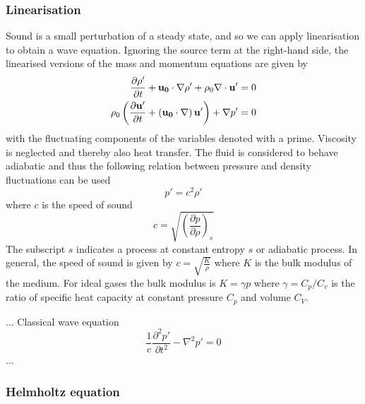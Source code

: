 \subsubsection*{Linearisation}
Sound is a small perturbation of a steady state, and so we can apply linearisation to obtain a wave equation.
Ignoring the source term at the right-hand side, the linearised versions of the mass and momentum equations are given by
\begin{align}
 \frac{\partial \rho'}{\partial t} + \mathbf{u_0} \cdot \nabla \rho' + \rho_0 \nabla \cdot \mathbf{u'} = 0 \\
 \rho_0 \left( \frac{\partial \mathbf{u'}}{\partial t} + \left(\mathbf{u_0} \cdot \nabla \right) \mathbf{u'}\right) + \nabla p' = 0
\end{align}
with the fluctuating components of the variables denoted with a prime. Viscosity
is neglected and thereby also heat transfer. The fluid is considered to behave
adiabatic and thus the following relation between pressure and density
fluctuations can be used
\begin{equation}
  p' = c^2 \rho'
\end{equation}
where $c$ is the speed of sound
\begin{equation}
  c = \sqrt{ \left( \frac{\partial p}{\partial \rho} \right)_{s} }
\end{equation}
The subscript $s$ indicates a process at constant entropy $s$ or adiabatic process.
In general, the speed of sound is given by $c = \sqrt{\frac{K}{\rho}}$ where $K$
is the bulk modulus of the medium. For ideal gases the bulk modulus is $K=\gamma
p$ where $\gamma=C_p/C_v$ is the ratio of specific heat capacity at constant
pressure $C_p$ and volume $C_V$.

...
Classical wave equation
\begin{equation}\label{eq:theory:sound:wave:classic}
 \frac{1}{c} \frac{\partial^2 p'}{\partial t^2} - \nabla^2 p' = 0
\end{equation}
...


\subsubsection*{Helmholtz equation}

